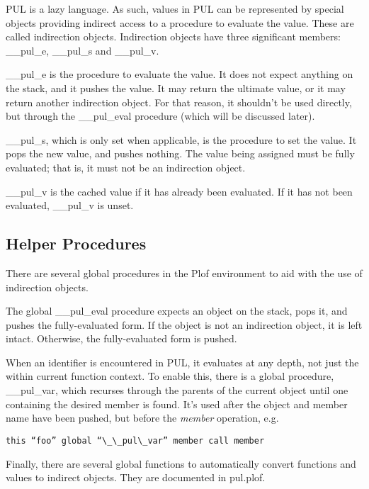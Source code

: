 PUL is a lazy language. As such, values in PUL can be represented by special objects providing indirect access to a procedure to evaluate the value. These are called indirection objects. Indirection objects have three significant members: \_\_pul\_e, \_\_pul\_s and \_\_pul\_v.

\_\_pul\_e is the procedure to evaluate the value. It does not expect anything on the stack, and it pushes the value. It may return the ultimate value, or it may return another indirection object. For that reason, it shouldn't be used directly, but through the \_\_pul\_eval procedure (which will be discussed later).

\_\_pul\_s, which is only set when applicable, is the procedure to set the value. It pops the new value, and pushes nothing. The value being assigned must be fully evaluated; that is, it must not be an indirection object.

\_\_pul\_v is the cached value if it has already been evaluated. If it has not been evaluated, \_\_pul\_v is unset.



\subsection{Helper Procedures}

There are several global procedures in the Plof environment to aid with the use of indirection objects.

The global \_\_pul\_eval procedure expects an object on the stack, pops it, and pushes the fully-evaluated form. If the object is not an indirection object, it is left intact. Otherwise, the fully-evaluated form is pushed.

When an identifier is encountered in PUL, it evaluates at any depth, not just the within current function context. To enable this, there is a global procedure, \_\_pul\_var, which recurses through the parents of the current object until one containing the desired member is found. It's used after the object and member name have been pushed, but before the \textit{member} operation, e.g.

\begin{verbatim}
this “foo” global “\_\_pul\_var” member call member
\end{verbatim}

Finally, there are several global functions to automatically convert functions and values to indirect objects. They are documented in pul.plof.



